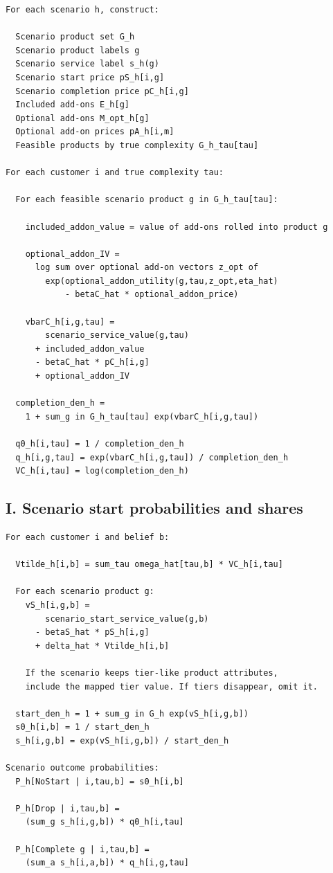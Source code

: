 \documentclass[11pt]{article}
\begin{document}
\begin{Verbatim}[fontsize=\small, frame=single]
For each scenario h, construct:

  Scenario product set G_h
  Scenario product labels g
  Scenario service label s_h(g)
  Scenario start price pS_h[i,g]
  Scenario completion price pC_h[i,g]
  Included add-ons E_h[g]
  Optional add-ons M_opt_h[g]
  Optional add-on prices pA_h[i,m]
  Feasible products by true complexity G_h_tau[tau]

For each customer i and true complexity tau:

  For each feasible scenario product g in G_h_tau[tau]:

    included_addon_value = value of add-ons rolled into product g

    optional_addon_IV =
      log sum over optional add-on vectors z_opt of
        exp(optional_addon_utility(g,tau,z_opt,eta_hat)
            - betaC_hat * optional_addon_price)

    vbarC_h[i,g,tau] =
        scenario_service_value(g,tau)
      + included_addon_value
      - betaC_hat * pC_h[i,g]
      + optional_addon_IV

  completion_den_h =
    1 + sum_g in G_h_tau[tau] exp(vbarC_h[i,g,tau])

  q0_h[i,tau] = 1 / completion_den_h
  q_h[i,g,tau] = exp(vbarC_h[i,g,tau]) / completion_den_h
  VC_h[i,tau] = log(completion_den_h)
\end{Verbatim}

\newpage
\subsection*{I. Scenario start probabilities and shares}

\begin{Verbatim}[fontsize=\small, frame=single]
For each customer i and belief b:

  Vtilde_h[i,b] = sum_tau omega_hat[tau,b] * VC_h[i,tau]

  For each scenario product g:
    vS_h[i,g,b] =
        scenario_start_service_value(g,b)
      - betaS_hat * pS_h[i,g]
      + delta_hat * Vtilde_h[i,b]

    If the scenario keeps tier-like product attributes,
    include the mapped tier value. If tiers disappear, omit it.

  start_den_h = 1 + sum_g in G_h exp(vS_h[i,g,b])
  s0_h[i,b] = 1 / start_den_h
  s_h[i,g,b] = exp(vS_h[i,g,b]) / start_den_h

Scenario outcome probabilities:
  P_h[NoStart | i,tau,b] = s0_h[i,b]

  P_h[Drop | i,tau,b] =
    (sum_g s_h[i,g,b]) * q0_h[i,tau]

  P_h[Complete g | i,tau,b] =
    (sum_a s_h[i,a,b]) * q_h[i,g,tau]
\end{Verbatim}
\end{document}
